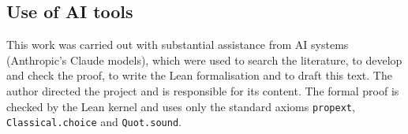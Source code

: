 \documentclass[11pt]{amsart}
\theoremstyle{definition}
\theoremstyle{remark}
\numberwithin{equation}{section}
\newcommand{\lean}[1]{{\def\_{\textunderscore\allowbreak}\texttt{#1}}}
\begin{document}
\subsection*{Use of AI tools}
This work was carried out with substantial assistance from AI systems (Anthropic's Claude models), which were used to
search the literature, to develop and check the proof, to write the Lean formalisation and to draft this text. The
author directed the project and is responsible for its content. The formal proof is checked by the Lean kernel and
uses only the standard axioms \lean{propext}, \lean{Classical.choice} and \lean{Quot.sound}.



\end{document}

